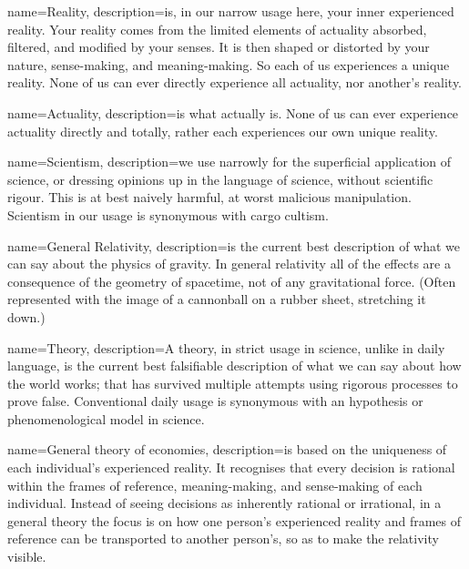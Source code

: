 ﻿
{
  name=Reality,
  description={is, in our narrow usage here, your inner experienced reality. Your reality comes from the limited elements of actuality absorbed, filtered, and modified by your senses. It is then shaped or distorted by your nature, sense-making, and meaning-making. So each of us experiences a unique reality. None of us can ever directly experience all actuality, nor another’s reality.}
}


{
  name=Actuality,
  description={is what actually is. None of us can ever experience actuality directly and totally, rather each experiences our own unique reality.}
}




{
  name=Scientism,
  description={we use narrowly for the superficial application of science, or dressing opinions up in the language of science, without scientific rigour. This is at best naively harmful, at worst malicious manipulation. Scientism in our usage is synonymous with cargo cultism.}
}


{
  name=General Relativity,
  description={is the current best description of what we can say about the physics of gravity. In general relativity all of the effects are a consequence of the geometry of spacetime, not of any gravitational force.  (Often represented with the image of a cannonball on a rubber sheet, stretching it down.)}
}  


{
  name=Theory,
  description={A theory, in strict usage in science, unlike in daily language, is the current best falsifiable description of what we can say about how the world works; that has survived multiple attempts using rigorous processes to prove false.  Conventional daily usage is synonymous with an hypothesis or phenomenological model in science.}
}




{
  name=General theory of economies,
  description={is based on the uniqueness of each individual’s experienced reality. It recognises that every decision is rational within the frames of reference, meaning\hyp{}making, and sense\hyp{}making of each individual. Instead of seeing decisions as inherently rational or irrational, in a general theory the focus is on how one person’s experienced reality and frames of reference  can be transported to another person’s, so as to make the relativity visible.}
}




